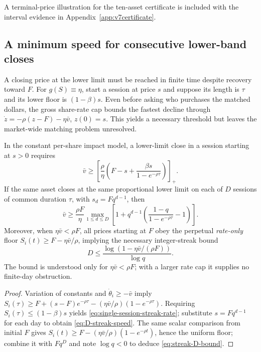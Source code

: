 \documentclass[review,hidelinks,onefignum,onetabnum]{siamonline250211}
\begin{document}
A terminal-price illustration for the ten-asset certificate is included
with the interval evidence in Appendix~\ref{app:v7certificate}.

\subsection{A minimum speed for consecutive lower-band closes}\label{subsec:multiday-rate}
A closing price at the lower limit must be reached in finite time despite recovery toward $F$. For $g(S)\equiv\eta$, start a session at price $s$ and suppose its length is $\tau$ and its lower floor is $(1-\beta)s$. Even before asking who purchases the matched dollars, the gross share-rate cap bounds the fastest decline through $\dot z=-\rho(z-F)-\eta\bar v$, $z(0)=s$. This yields a necessary threshold but leaves the market-wide matching problem unresolved.
\begin{proposition}\label{prop:rolling-rate}
In the constant per-share impact model, a lower-limit close in a session starting at $s>0$ requires
\begin{equation}\label{eq:single-session-streak-rate}
 \quad\bar v\ge \left[\frac{\rho}{\eta}\left(F-s+
 \frac{\beta s}{1-e^{-\rho\tau}}\right)\right]_+.\quad
\end{equation}
If the same asset closes at the same proportional lower limit on each of $D$ sessions of common duration $\tau$, with $s_d=Fq^{d-1}$, then
\begin{equation}\label{eq:D-streak-speed}
\quad\bar v\ge\frac{\rho F}{\eta}\max_{1\le d\le D}
 \left[1+q^{d-1}\left(\frac{1-q}{1-e^{-\rho\tau}}-1\right)\right].\quad
\end{equation}
Moreover, when $\eta\bar v<\rho F$, all prices starting at $F$ obey the perpetual \emph{rate-only} floor $S_i(t)\ge F-\eta\bar v/\rho$, implying the necessary integer-streak bound
\begin{equation}\label{eq:streak-D-bound}
\quad D\le\frac{\log(1-\eta\bar v/(\rho F))}{\log q}.\quad
\end{equation}
The bound is understood only for $\eta\bar v<\rho F$; with a larger rate cap it supplies no finite-day obstruction.
\end{proposition}
\begin{proof}
Variation of constants and $\dot\theta_i\ge-\bar v$ imply
$S_i(\tau)\ge F+(s-F)e^{-\rho\tau}-(\eta\bar v/\rho)(1-e^{-\rho\tau})$.
Requiring $S_i(\tau)\le(1-\beta)s$ yields \eqref{eq:single-session-streak-rate}; substitute $s=Fq^{d-1}$ for each day to obtain \eqref{eq:D-streak-speed}. The same scalar comparison from initial $F$ gives $S_i(t)\ge F-(\eta\bar v/\rho)(1-e^{-\rho t})$, hence the uniform floor; combine it with $Fq^D$ and note $\log q<0$ to deduce \eqref{eq:streak-D-bound}.
\end{proof}
\end{document}
